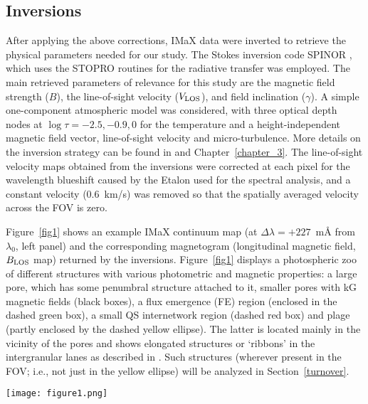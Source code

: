 \documentclass[goettingen, gauss, print]{thesis}
\begin{document}
\subsection{Inversions}
\label{inversions}
After applying the above corrections, IMaX data were inverted to retrieve the physical parameters needed for our study. The Stokes inversion code SPINOR \citep{frutiger_properties_2000}, which uses the STOPRO routines for the radiative transfer \citep{solanki_photospheric_1987} was employed. The main retrieved parameters of relevance for this study are the magnetic field strength ($B$), the line-of-sight velocity ($V_{\rm LOS}$), and field inclination ($\gamma$). %
A simple one-component atmospheric model was considered, with three optical depth nodes at $\log\tau=-2.5, -0.9, 0$ for the temperature and a height-independent magnetic field vector, line-of-sight velocity and micro-turbulence. More details on the inversion strategy can be found in \cite{solanki_second_2017} and Chapter~\ref{chapter_3}. The line-of-sight velocity maps obtained from the inversions were corrected at each pixel for the wavelength blueshift caused by the Etalon used for the spectral analysis, and a constant velocity (0.6\, km/s) was removed so that the spatially averaged velocity across the FOV is zero.

Figure~\ref{fig1} shows an example IMaX continuum map (at $\Delta \lambda=+227$\, m\AA{} from $\lambda_0$, left panel) and the corresponding magnetogram (longitudinal magnetic field, $B_{\rm LOS}$ map) returned by the inversions. Figure~\ref{fig1} displays a photospheric zoo of different structures with various photometric  and magnetic properties: a large pore, which has some penumbral structure attached to it, smaller pores with kG magnetic fields (black boxes), a flux emergence (FE) region (enclosed in the dashed green box), a small QS internetwork region (dashed red box) and plage (partly enclosed by the dashed yellow ellipse). The latter is located mainly in the vicinity of the pores and shows elongated structures or `ribbons' in the intergranular lanes as described in \citet{berger_solar_2004}. Such structures (wherever present in the FOV; i.e., not just in the yellow ellipse) will be analyzed in Section~\ref{turnover}.


\begin{figure*}
\centering
\texttt{[image: figure1.png]}
\caption{\textit{Left panel:}
Continuum contrast at 525 nm. \textit{Right panel:} its co-spatial and co-temporal longitudinal magnetic field map retrieved from the inversions. The black boxes (solid lines) contain small pores characterized by contrast below unity and kG magnetic fields. The dashed green box encloses an area with emerging flux. The dashed yellow ellipse outlines a region of plage composed of magnetic elements embedded in intergranular lanes. The dashed red box contains a quiet-Sun internetwork region with weak fields (average of 20\,G) and mean contrast of unity (by definition).}
\label{fig1}
\end{figure*}
\end{document}
